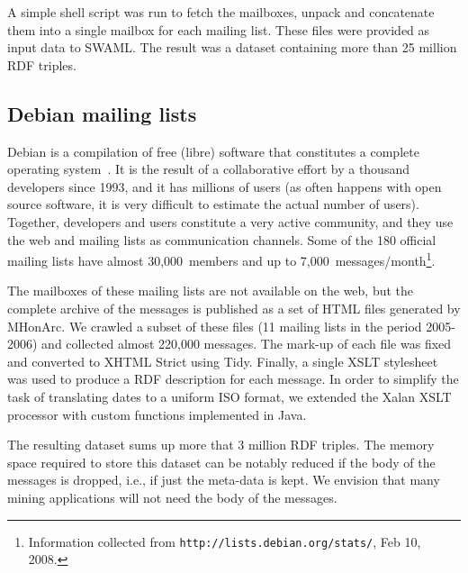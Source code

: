 \documentclass{../templates/www2008-submission}
\begin{document}
A simple shell script was run to fetch the mailboxes, unpack and concatenate them
into a single mailbox for each mailing list. These files
were provided as input data to SWAML. The
result was a dataset containing more than 25 million RDF triples.

\subsection{Debian mailing lists}\label{sec:debian}

Debian is a compilation of free (libre) software that constitutes a
complete operating system~\cite{Krafft2005}. It is the result of a
collaborative effort by a thousand developers since 1993, and it has
millions of users (as often happens with open source software, it is very
difficult to estimate the actual number of users). Together, developers
and users constitute a very active community, and they use the web and
mailing lists as communication channels. Some of the 180 official mailing
lists have almost 30,000~members and up to
7,000~messages/month\footnote{Information collected from \texttt{http://lists.debian.org/stats/}, Feb 10, 2008.}.

The mailboxes of these mailing lists are not available on the web, but
the complete archive of the messages is published as a set of
HTML files generated by MHonArc. We crawled a subset of these files
(11 mailing lists in the period 2005-2006) and collected almost 220,000
messages. The mark-up of each file was fixed and converted to XHTML Strict
using Tidy. Finally, a single XSLT stylesheet was used to produce a
RDF description for each message. In order to simplify the
task of translating dates to a uniform ISO format, we extended
the Xalan XSLT processor with custom functions implemented in Java.

The resulting dataset sums up more that 3 million RDF triples. The
memory space required to store this dataset can be notably
reduced if the body of the messages is dropped, i.e., if just the meta-data
is kept. We envision that many mining applications will not need the
body of the messages.

%
%
\end{document}

